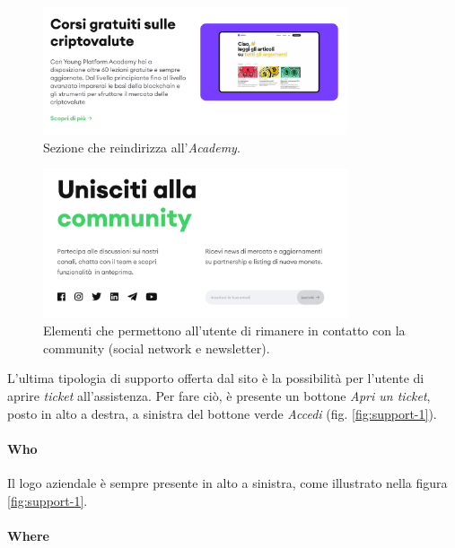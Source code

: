 \begin{figure}[H]
  \centering
  \includegraphics[width=0.80\textwidth]{res/images/internal-pages/support/support-5.png}
  \caption{Sezione che reindirizza all'\textit{Academy}.}
  \label{fig:support-5}
\end{figure}

\begin{figure}[H]
  \centering
  \includegraphics[width=0.80\textwidth]{res/images/internal-pages/support/support-6.png}
  \caption{Elementi che permettono all'utente di rimanere in contatto 
  con la community (social network e newsletter).}
  \label{fig:support-6}
\end{figure}

L'ultima tipologia di supporto offerta dal sito è la possibilità per 
l'utente di aprire \textit{ticket} all'assistenza. Per fare ciò, è 
presente un bottone \textit{Apri un ticket}, posto in alto a destra, a 
sinistra del bottone verde \textit{Accedi} (fig. \ref{fig:support-1}). 

\paragraph{Who}

Il logo aziendale è sempre presente in alto a sinistra, come illustrato 
nella figura \ref{fig:support-1}.

\paragraph{Where}

